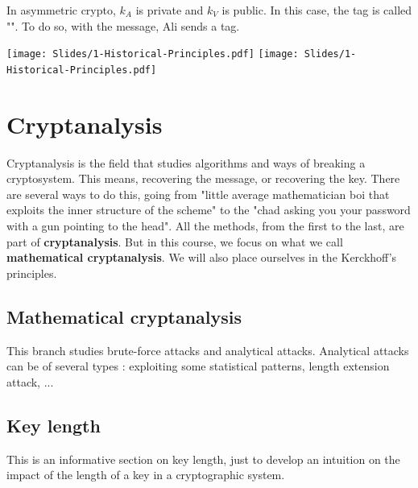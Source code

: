 \documentclass[../Cryptography.tex]{subfiles}
\begin{document}
In asymmetric crypto, $k_A$ is private and $k_V$ is public. In this case, the tag is called "".
To do so, with the message, Ali sends a tag. \\

\begin{center}
    \texttt{[image: Slides/1-Historical-Principles.pdf]}
    \texttt{[image: Slides/1-Historical-Principles.pdf]}
\end{center}

\section{Cryptanalysis}
Cryptanalysis is the field that studies algorithms and ways of breaking a cryptosystem. This means, recovering the message, or recovering the key. There are several ways to do this, going from "little average mathematician boi that exploits the inner structure of the scheme" to the "chad asking you your password with a gun pointing to the head". All the methods, from the first to the last, are part of \textbf{cryptanalysis}. But in this course, we focus on what we call \textbf{mathematical cryptanalysis}. We will also place ourselves in the Kerckhoff's principles.\\


\subsection{Mathematical cryptanalysis}

This branch studies brute-force attacks and analytical attacks. Analytical attacks can be of several types : exploiting some statistical patterns, length extension attack, ... \\

\subsection{Key length}
This is an informative section on key length, just to develop an intuition on the impact of the length of a key in a cryptographic system. \\
\end{document}
